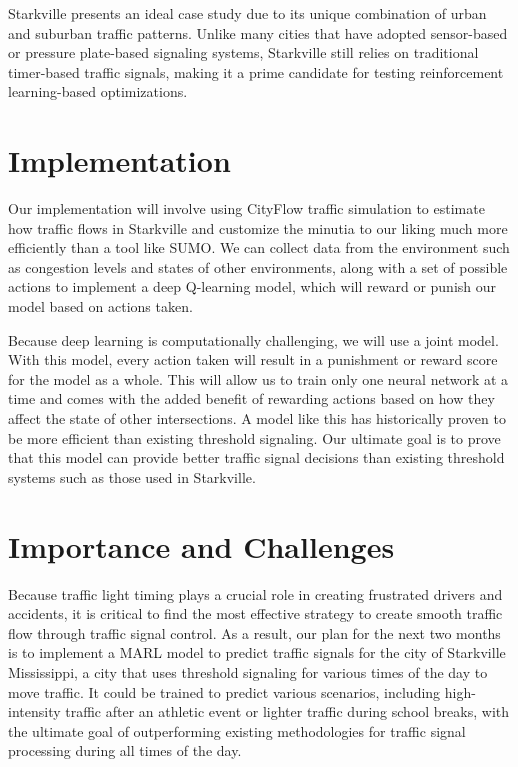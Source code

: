 \documentclass[conference]{IEEEtran}
\begin{document}
Starkville presents an ideal case study due to its unique combination of urban and suburban traffic patterns. Unlike many cities that have adopted sensor-based or pressure plate-based signaling systems, Starkville still relies on traditional timer-based traffic signals, making it a prime candidate for testing reinforcement learning-based optimizations.

\section{Implementation}

Our implementation will involve using CityFlow traffic simulation to estimate how traffic flows in Starkville and customize the minutia to our liking much more efficiently than a tool like SUMO. We can collect data from the environment such as congestion levels and states of other environments, along with a set of possible actions to implement a deep Q-learning model, which will reward or punish our model based on actions taken.

Because deep learning is computationally challenging, we will use a joint model. With this model, every action taken will result in a punishment or reward score for the model as a whole. This will allow us to train only one neural network at a time and comes with the added benefit of rewarding actions based on how they affect the state of other intersections. A model like this has historically proven to be more efficient than existing threshold signaling. Our ultimate goal is to prove that this model can provide better traffic signal decisions than existing threshold systems such as those used in Starkville. 

\section{Importance and Challenges}

Because traffic light timing plays a crucial role in creating frustrated drivers and accidents, it is critical to find the most effective strategy to create smooth traffic flow through traffic signal control. As a result, our plan for the next two months is to implement a MARL model to predict traffic signals for the city of Starkville Mississippi, a city that uses threshold signaling for various times of the day to move traffic. It could be trained to predict various scenarios, including high-intensity traffic after an athletic event or lighter traffic during school breaks, with the ultimate goal of outperforming existing methodologies for traffic signal processing during all times of the day. 
\end{document}
